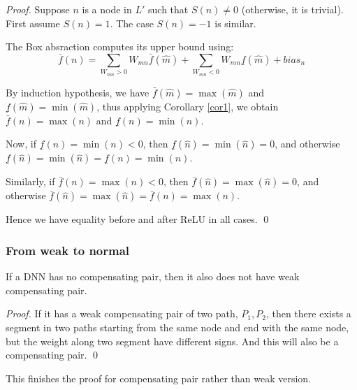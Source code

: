 		\begin{proof}
			Suppose $n$ is a node in $L'$ such that $S(n)\neq 0$ (otherwise, it is trivial). 
			First assume $S(n)=1$. The case $S(n)=-1$ is similar. 
			
			The Box absraction computes its upper bound using:
			$$\bar{f}(n)= \sum_{W_{mn}>0} W_{mn} \bar{f}(\hat{m}) + \sum_{W_{mn}<0} W_{mn} \underline{f}(\hat{m}) + bias_n$$
			
			By induction hypothesis, we have 
			$\bar{f}(\hat{m})=\max(\hat{m})$ and
			$\underline{f}(\hat{m})=\min(\hat{m})$, thus 
			applying Corollary \ref{cor1}, we obtain
			$\bar{f}(n)=\max(n)$ and 
			$\underline{f}(n)=\min(n)$.
			
			Now, if $\underline{f}(n)=\min(n)<0$, 
			then $\underline{f}(\hat{n})=\min(\hat{n})=0$, 
			and otherwise 
			$\underline{f}(\hat{n})=\min(\hat{n})=\underline{f}(n)=\min(n)$.
			
			Similarly, 
			if $\bar{f}(n)=\max(n)<0$, 
			then $\bar{f}(\hat{n})=\max(\hat{n})=0$, 
			and otherwise 
			$\bar{f}(\hat{n})=\max(\hat{n})=\bar{f}(n)=\max(n)$.
			
			Hence we have equality before and after ReLU in all cases. \qed
		\end{proof}
		
		
		
		\subsubsection*{From weak to normal}
		
		\begin{lemma}
			If a DNN has no compensating pair, then it also does not have weak compensating pair.
		\end{lemma}
		
		\begin{proof}
			If it has a weak compensating pair of two path, $P_1,P_2$, then there exists a segment in two paths starting from the same node and end with the same node, but the weight along two segment have different signs. And this will also be a compensating pair. \qed
		\end{proof}
		
		This finishes the proof for compensating pair rather than weak version.
		

